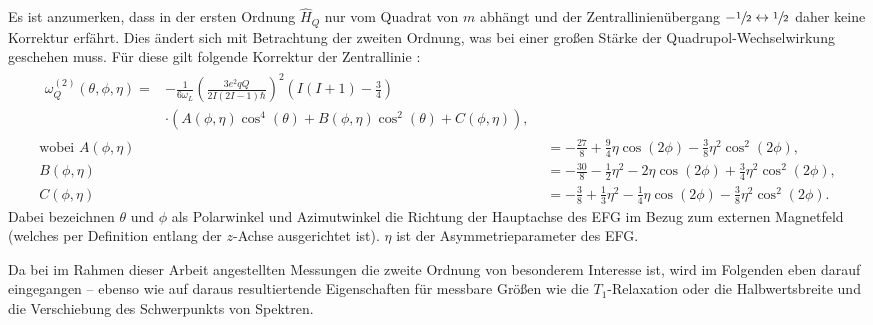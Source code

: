 Es ist anzumerken, dass in der ersten Ordnung $\hat{H}_Q$ nur vom Quadrat von $m$ abhängt und der Zentrallinienübergang $-\sfrac{1}{2} \leftrightarrow \sfrac{1}{2}$ daher keine Korrektur erfährt. Dies ändert sich mit Betrachtung der zweiten Ordnung, was bei einer großen Stärke der Quadrupol-Wechselwirkung geschehen muss. Für diese gilt folgende Korrektur der Zentrallinie \cite{man_quadrupole_2000}:
\begin{align}
    \begin{split}
        \omega_Q^{(2)} \left( \theta, \phi, \eta \right) =& - \frac{1}{6 \omega_L} \left(\frac{3 e^2 q Q}{2 I \left(2 I - 1 \right) \hbar}\right)^2 \left( I \left(I + 1 \right) - \frac{3}{4} \right) \\
		& \cdot \left( A \left(\phi, \eta \right) \cos^4 \left( \theta \right) + B \left(\phi, \eta \right) \cos^2 \left( \theta \right) + C \left(\phi, \eta \right) \right), \label{eqn:theo:omega2}
    \end{split}\\
    \text{wobei}\,\, A \left( \phi, \eta \right) &= -\frac{27}{8} + \frac{9}{4} \eta \cos \left(2 \phi \right) - \frac{3}{8} \eta^2 \cos^2 \left(2 \phi \right), \\
    B \left( \phi, \eta \right) &= -\frac{30}{8} - \frac{1}{2} \eta^2 - 2\eta \cos \left(2 \phi \right) + \frac{3}{4} \eta^2 \cos^2 \left(2 \phi \right), \\
    C \left( \phi, \eta \right) &= -\frac{3}{8} + \frac{1}{3} \eta^2 - \frac{1}{4} \eta \cos \left(2 \phi \right) - \frac{3}{8} \eta^2 \cos^2 \left(2 \phi \right).
\end{align}
Dabei bezeichnen $\theta$ und $\phi$ als Polarwinkel und Azimutwinkel die Richtung der Hauptachse des EFG im Bezug zum externen Magnetfeld (welches per Definition entlang der $z$-Achse ausgerichtet ist). $\eta$ ist der Asymmetrieparameter des EFG.


\par\bigskip

Da bei im Rahmen dieser Arbeit angestellten Messungen die zweite Ordnung von besonderem Interesse ist, wird im Folgenden eben darauf eingegangen -- ebenso wie auf daraus resultiertende Eigenschaften für messbare Größen wie die $T_1$-Relaxation oder die Halbwertsbreite und die Verschiebung des Schwerpunkts von Spektren.

